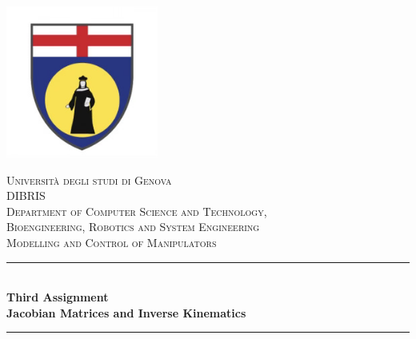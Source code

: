 \begin{titlepage}

\newcommand{\HRule}{\rule{\linewidth}{0.5mm}} %

\center
\includegraphics[width=5cm]{Title/Unige-logo.jpeg}\\[1cm] %
 

\center %


\textsc{\Huge Università degli studi di Genova}\\[1cm] %
\textsc{\LARGE DIBRIS}\\[0.3cm]
\textsc{\Small Department of Computer Science and Technology,}\\
\textsc{\Small Bioengineering, Robotics and System Engineering}\\[1cm] %
\textsc{\LARGE{Modelling and Control of Manipulators}}\\[1cm] %

\makeatletter
\HRule \\[0.4cm]
{ \huge \bfseries Third Assignment}\\[0.2cm] 
{\Large \bfseries Jacobian Matrices and Inverse Kinematics}\\
\HRule \\[1.5cm]
 

\end{titlepage}
